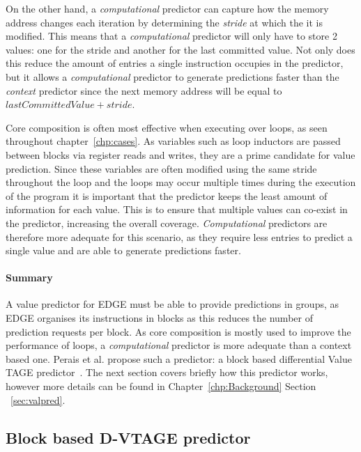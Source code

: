 On the other hand, a \textit{computational} predictor can capture how the memory address changes each iteration by determining the \textit{stride} at which the it is modified.
This means that a \textit{computational} predictor will only have to store 2 values: one for the stride and another for the last committed value.
Not only does this reduce the amount of entries a single instruction occupies in the predictor, but it allows a \textit{computational} predictor to generate predictions faster than the \textit{context} predictor since the next memory address will be equal to $ lastCommittedValue + stride$.

Core composition is often most effective when executing over loops, as seen throughout chapter~\ref{chp:cases}.
As variables such as loop inductors are passed between blocks via register reads and writes, they are a prime candidate for value prediction.
Since these variables are often modified using the same stride throughout the loop and the loops may occur multiple times during the execution of the program it is important that the predictor keeps the least amount of information for each value.
This is to ensure that multiple values can co-exist in the predictor, increasing the overall coverage.
\textit{Computational} predictors are therefore more adequate for this scenario, as they require less entries to predict a single value and are able to generate predictions faster.


\paragraph*{Summary}

A value predictor for EDGE must be able to provide predictions in groups, as EDGE organises its instructions in blocks as this reduces the number of prediction requests per block.
As core composition is mostly used to improve the performance of loops, a \textit{computational} predictor is more adequate than a context based one.
Perais et al. propose such a predictor: a block based differential Value TAGE predictor~\cite{peraisBeBop2015}.
The next section covers briefly how this predictor works, however more details can be found in Chapter~\ref{chp:Background} Section ~\ref{sec:valpred}.

\subsection{Block based D-VTAGE predictor}

